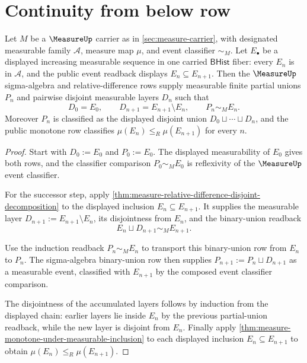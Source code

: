 \section{Continuity from below row}
\label{sec:measure-continuity-from-below}

\begin{theorem}
\label{thm:measure-monotone-partial-union-chain}
Let $M$ be a $\MeasureUp$ carrier as in \autoref{sec:measure-carrier}, with
designated measurable family $\mathcal{A}$, measure map $\mu$, and event
classifier $\sim_M$. Let $E_\bullet$ be a displayed increasing measurable
sequence in one carried $\mathsf{BHist}$ fiber: every $E_n$ is in
$\mathcal{A}$, and the public event readback displays $E_n\subseteq E_{n+1}$.
Then the $\MeasureUp$ sigma-algebra and relative-difference rows supply
measurable finite partial unions $P_n$ and pairwise disjoint measurable layers
$D_n$ such that
$$
D_0=E_0,\qquad D_{n+1}=E_{n+1}\setminus E_n,
\qquad P_n\sim_M E_n.
$$
Moreover $P_n$ is classified as the displayed disjoint union
$D_0\sqcup\cdots\sqcup D_n$, and the public monotone row classifies
$\mu(E_n)\le_R\mu(E_{n+1})$ for every $n$.
\end{theorem}
\begin{proof}
Start with $D_0:=E_0$ and $P_0:=E_0$. The displayed measurability of $E_0$
gives both rows, and the classifier comparison $P_0\sim_M E_0$ is reflexivity
of the $\MeasureUp$ event classifier.

For the successor step, apply
\autoref{thm:measure-relative-difference-disjoint-decomposition} to the
displayed inclusion $E_n\subseteq E_{n+1}$. It supplies the measurable layer
$D_{n+1}:=E_{n+1}\setminus E_n$, its disjointness from $E_n$, and the
binary-union readback
$$
E_n\sqcup D_{n+1}\sim_M E_{n+1}.
$$

Use the induction readback $P_n\sim_M E_n$ to transport this binary-union row
from $E_n$ to $P_n$. The sigma-algebra binary-union row then supplies
$P_{n+1}:=P_n\sqcup D_{n+1}$ as a measurable event, classified with
$E_{n+1}$ by the composed event classifier comparison.

The disjointness of the accumulated layers follows by induction from the
displayed chain: earlier layers lie inside $E_n$ by the previous partial-union
readback, while the new layer is disjoint from $E_n$. Finally apply
\autoref{thm:measure-monotone-under-measurable-inclusion} to each displayed
inclusion $E_n\subseteq E_{n+1}$ to obtain
$\mu(E_n)\le_R\mu(E_{n+1})$.
\end{proof}

